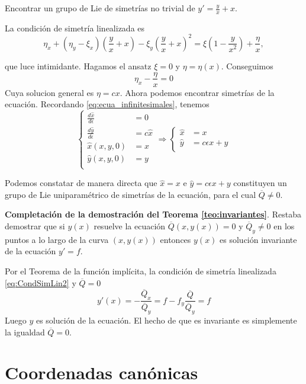  \begin{ejemplo} Encontrar un grupo de Lie de simetrías no trivial de $y'=\frac{y}{x}+x$.
   \end{ejemplo}

 
 La condición de simetría linealizada es
 \[\eta_x+(\eta_y-\xi_x)\left(\frac{y}{x}+x\right)-\xi_y\left(\frac{y}{x}+x\right)^2
 =\xi \left(1-\frac{y}{x^2}\right)
+\frac{\eta}{x},\] 

que luce intimidante. Hagamos el ansatz $\xi=0$ y $\eta=\eta(x)$. Conseguimos
\[\eta_x-\frac{\eta}{x}=0\]
Cuya solucion general es $\boxed{\eta=cx}$. Ahora podemos encontrar simetrías de la ecuación. Recordando \eqref{eq:ecua_infinitesimales}, tenemos
\[
\left\{
\begin{array}{ll}
\frac{d\hat{x}}{d\epsilon}&=0\\
\frac{d\hat{y}}{d\epsilon}&=c\hat{x}\\
\hat{x}(x,y,0)&=x\\
\hat{y}(x,y,0)&=y\\
\end{array}
\right. 
\Rightarrow 
\left\{
\begin{array}{ll}
\hat{x}&=x\\
\hat{y}&=c\epsilon x+y\\
\end{array}
\right.
\]

Podemos constatar de manera directa que $\hat{x}=x$ e $\hat{y}=c\epsilon x+y$ constituyen un grupo de Lie uniparamétrico de simetrías de la ecuación, para el cual $\overline{Q}\neq 0$.

\textbf{Completación de la demostración  del Teorema \ref{teo:invariantes}}.
Restaba demostrar que si $y(x)$ resuelve la ecuación $\overline{Q}(x,y(x))=0$ y $\overline{Q}_y\neq 0$ en los puntos a lo largo de la curva $(x,y(x))$ entonces $y(x)$ es solución invariante de la ecuación $y'=f$. 

Por el Teorema de la función implícita,
la condición de simetría linealizada \eqref{eq:CondSimLin2} y $\overline{Q}=0$
\[y'(x)=-\frac{\overline{Q}_x}{\overline{Q}_y}=f-f_y\frac{\overline{Q}}{\overline{Q}_y}=f\]
Luego $y$ es solución de la ecuación. El hecho de que es invariante es simplemente la igualdad 
$\overline{Q}=0$.









\section{Coordenadas canónicas}

